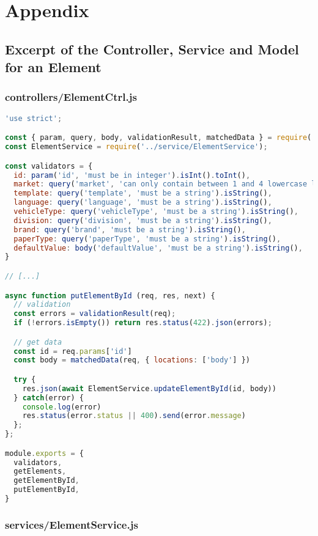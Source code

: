\chapter{Appendix}
\label{sec:appendix}

\section{Excerpt of the Controller, Service and Model for an Element}
\label{sec:appendix:mvcs}

\subsection{controllers/ElementCtrl.js}

\begin{lstlisting}[language=JavaScript]
'use strict';

const { param, query, body, validationResult, matchedData } = require('express-validator');
const ElementService = require('../service/ElementService');

const validators = {
  id: param('id', 'must be in integer').isInt().toInt(),
  market: query('market', 'can only contain between 1 and 4 lowercase letters').matches(/^[a-z]{1,4}$/),
  template: query('template', 'must be a string').isString(),
  language: query('language', 'must be a string').isString(),
  vehicleType: query('vehicleType', 'must be a string').isString(),
  division: query('division', 'must be a string').isString(),
  brand: query('brand', 'must be a string').isString(),
  paperType: query('paperType', 'must be a string').isString(),
  defaultValue: body('defaultValue', 'must be a string').isString(),
}

// [...]

async function putElementById (req, res, next) {
  // validation
  const errors = validationResult(req);
  if (!errors.isEmpty()) return res.status(422).json(errors);

  // get data
  const id = req.params['id']
  const body = matchedData(req, { locations: ['body'] })

  try {
    res.json(await ElementService.updateElementById(id, body))
  } catch(error) {
    console.log(error)
    res.status(error.status || 400).send(error.message)
  };
};

module.exports = {
  validators,
  getElements,
  getElementById,
  putElementById,
}
\end{lstlisting}

\subsection{services/ElementService.js}

